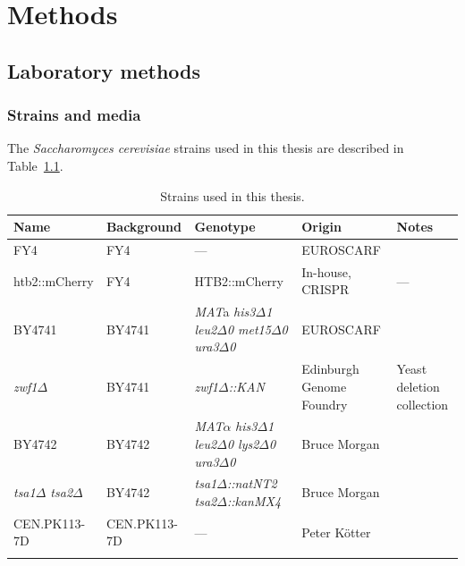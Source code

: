 \chapter{Methods}
\label{ch:methods}

\section{Laboratory methods}
\label{sec:methods-lab}

\subsection{Strains and media}
\label{subsec:methods-strains_media}

The \textit{Saccharomyces cerevisiae} strains used in this thesis are described in Table~\ref{tab:methods-strains}.

\begin{table}[hb]
  \footnotesize
  \centering
  \begin{tabularx}{\linewidth}{bbbbb}
    \toprule
    Name & Background & Genotype & Origin & Notes\\
    \midrule
    FY4 & FY4 & --- & EUROSCARF & \textcite{winstonConstructionSetConvenient1995} \\
    htb2::mCherry & FY4 & HTB2::mCherry & In-house, CRISPR & --- \\
    BY4741 & BY4741 & \textit{MAT}a \textit{his3$\Delta$1 leu2$\Delta$0 met15$\Delta$0 ura3$\Delta$0} & EUROSCARF & \textcite{brachmannDesignerDeletionStrains1998}\\
    \textit{zwf1$\Delta$} & BY4741 & \textit{zwf1$\Delta$::KAN} & Edinburgh Genome Foundry & Yeast deletion collection \\
    BY4742 & BY4742 & \textit{MAT}$\alpha$ \textit{his3$\Delta$1 leu2$\Delta$0 lys2$\Delta$0 ura3$\Delta$0} & Bruce Morgan & \textcite{calabreseHyperoxidationMitochondrialPeroxiredoxin2019}\\
    \textit{tsa1$\Delta$ tsa2$\Delta$} & BY4742 & \textit{tsa1$\Delta$::natNT2 tsa2$\Delta$::kanMX4} & Bruce Morgan & \textcite{calabreseHyperoxidationMitochondrialPeroxiredoxin2019} \\
    CEN.PK113-7D & CEN.PK113-7D & --- & Peter K\"{o}tter & \textcite{nijkampNovoSequencingAssembly2012} \\
    \bottomrule \\
  \end{tabularx}
  \caption{Strains used in this thesis.}
  \label{tab:methods-strains}
\end{table}

